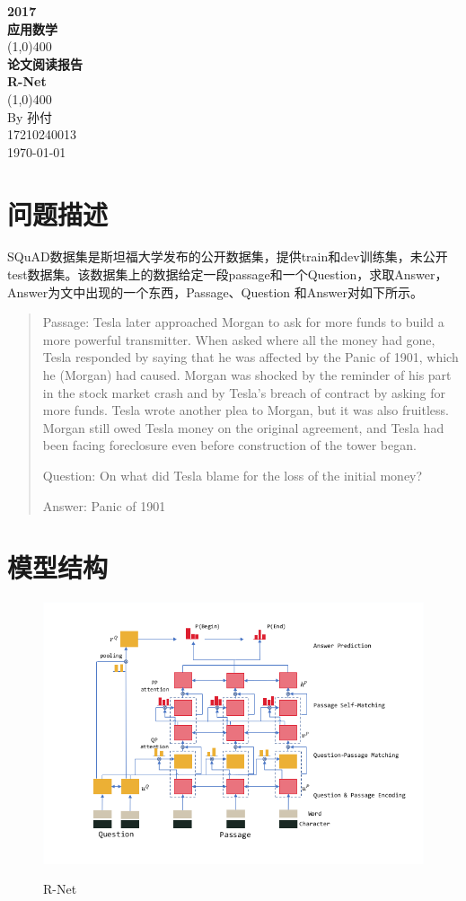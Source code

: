 \documentclass[UTF8]{article}
\begin{document}
\begin{titlepage}
    \begin{center}
        \vspace*{1cm}
        \Large{\textbf{2017}}\\
        \Large{\textbf{应用数学}}\\
        \vfill
        \line(1,0){400}\\[1mm]
        \huge{\textbf{论文阅读报告}}\\
        \Large{\textbf{R-Net}}\\
        \line(1,0){400}\\
        \vfill
        By 孙付\\
        17210240013\\
        \today\\
    \end{center}
\end{titlepage}
\section{问题描述}
SQuAD数据集是斯坦福大学发布的公开数据集，提供train和dev训练集，未公开test数据集。该数据集上的数据给定一段passage和一个Question，求取Answer，Answer为文中出现的一个东西，Passage、Question 和Answer对如下所示。
\begin{quotation}
\noindent Passage: Tesla later approached Morgan to ask for more funds to build a more powerful transmitter.  When asked where all the money had gone, Tesla responded by saying that he was affected by the Panic of 1901, which he (Morgan) had caused. Morgan was shocked by the reminder of his part in the stock market crash and by Tesla’s breach of contract by asking for more funds. Tesla wrote another plea to Morgan, but it was also fruitless. Morgan still owed Tesla money on the original agreement, and Tesla had been facing foreclosure even before construction of the tower began.

\noindent Question: On what did Tesla blame for the loss of the initial money?

\noindent Answer: Panic of 1901
\end{quotation}
\section{模型结构}
\begin{figure}[htpb]
    \centering
    \includegraphics[width=0.8\linewidth]{r-net.png}
    \label{fig:R-Net}
    \caption{R-Net}
\end{figure}
\end{document}
